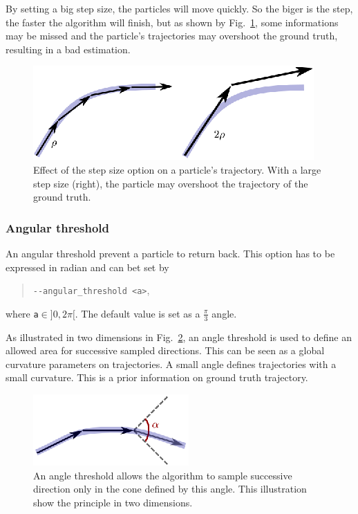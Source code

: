         By setting a big step size, the particles will move quickly. So the biger is the step, the faster the algorithm will finish, but as shown by Fig.~\ref{tracto-fig:stepSize}, some informations may be missed and the particle's trajectories may overshoot the ground truth, resulting in a bad estimation.

        \begin{figure}
            \centering
            \includegraphics[height=0.1\textheight]{stepSize}
            \caption{Effect of the step size option on a particle's trajectory. With a large step size (right), the particle may overshoot the trajectory of the ground truth.}
            \label{tracto-fig:stepSize}
        \end{figure}


    \subsubsection*{Angular threshold}
        An angular threshold prevent a particle to return back. This option has to be expressed in radian and can bet set by
            \begin{quote}
                \texttt{-\hspace{0.1mm}-angular\_threshold <a>},
            \end{quote}
        where \texttt{a}$\in]0,2\pi[$. The default value is set as a $\tfrac{\pi}{3}$ angle.

        As illustrated in two dimensions in Fig.~\ref{tracto-fig:angleThreshold}, an angle threshold is used to define an allowed area for successive sampled directions. This can be seen as a global curvature parameters on trajectories. A small angle defines trajectories with a small curvature. This is a prior information on ground truth trajectory.

        \begin{figure}
            \centering
            \includegraphics[height=0.1\textheight]{angleThreshold}
            \caption{An angle threshold allows the algorithm to sample successive direction only in the cone defined by this angle. This illustration show the principle in two dimensions.}
            \label{tracto-fig:angleThreshold}
        \end{figure}


